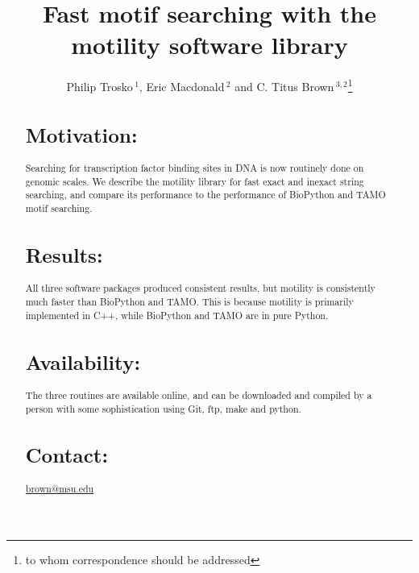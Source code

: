 \documentclass{bioinfo}
\begin{document}

\title[short Title]{Fast motif searching with the motility software library}
\author[Sample \textit{et~al}]{Philip Trosko\,$^{1}$, 
Eric Macdonald\,$^{2}$ 
and C. Titus Brown\,$^{3,2}$\footnote{to whom correspondence should be addressed}}
\address{$^{1}$Trosko's Consulting and Programming, 
1630 Sylvan Glen, Okemos, MI, 48864\\
$^{2}$Computer Science and Engineering, Michigan State University, 48823.\\
$^{3}$Microbiology and Molecular Genetics, Michigan State University, 48823.}



\maketitle

\begin{abstract}

\section{Motivation:}

Searching for transcription factor binding sites in DNA is now
routinely done on genomic scales.  We describe the motility library
for fast exact and inexact string searching, and compare its performance
to the performance of BioPython and TAMO motif searching.

\section{Results:}

All three software packages produced consistent results, but motility is
consistently much faster than BioPython and TAMO.  This is because
motility is primarily implemented in C++, while BioPython and TAMO
are in pure Python.

\section{Availability:}
The three routines are available online, 
and can be downloaded and compiled by a person with some sophistication 
using Git, ftp, make and python.
\section{Contact:} \href{brown@msu.edu}{brown@msu.edu}
\end{abstract}
\end{document}
